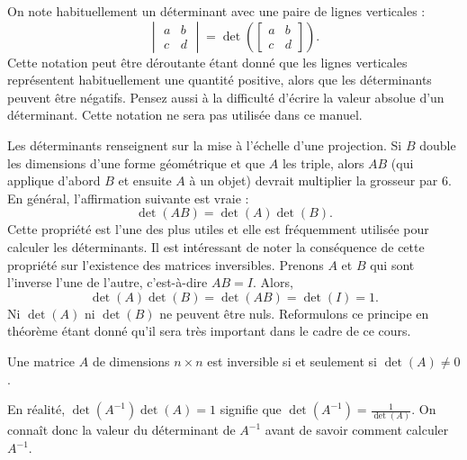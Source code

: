 On note habituellement un déterminant avec une paire de lignes verticales :
\begin{equation*}
\begin{vmatrix}
a & b \\
c & d
\end{vmatrix}
=
\det \left(
\begin{bmatrix}
a & b \\
c & d
\end{bmatrix}
\right) .
\end{equation*}
Cette notation peut être déroutante étant donné que les lignes verticales représentent habituellement une quantité positive, alors que les déterminants peuvent être négatifs. Pensez aussi à la difficulté d'écrire la valeur absolue d'un déterminant. Cette notation ne sera pas utilisée dans ce manuel.

\medskip

Les déterminants renseignent sur la mise à l'échelle d'une projection. Si $B$ double les dimensions d'une forme géométrique et que $A$ les triple, alors $AB$ (qui applique d'abord $B$ et ensuite $A$ à un objet) devrait multiplier la grosseur par $6$. En général, l'affirmation suivante est vraie :
\begin{equation*}
\det(AB) = \det(A)\det(B) .
\end{equation*}
Cette propriété est l'une des plus utiles et elle est fréquemment utilisée pour calculer les déterminants. Il est intéressant de noter la conséquence de cette propriété sur l'existence des matrices inversibles. Prenons $A$ et $B$ qui sont l'inverse l'une de l'autre, c'est-à-dire $AB=I$. Alors,
\begin{equation*}
\det(A)\det(B) = \det(AB) = \det(I) = 1 .
\end{equation*}
Ni $\det(A)$ ni $\det(B)$ ne peuvent être nuls. Reformulons ce principe en théorème étant donné qu'il sera très important dans le cadre de ce cours.

\begin{theorem}
Une matrice $A$ de dimensions $n \times n$ est inversible si et seulement si $\det (A) \not= 0$.
\end{theorem}

En réalité, $\det(A^{-1}) \det(A) = 1$ signifie que $\det(A^{-1}) =
\frac{1}{\det(A)}$. On connaît donc la valeur du déterminant de $A^{-1}$ avant de savoir comment calculer $A^{-1}$.

